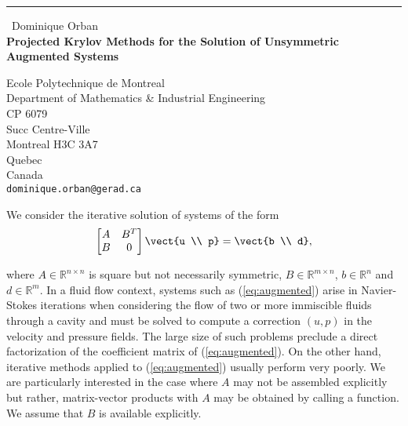 \documentclass{report}
\begin{document}
\begin{center}
\rule{6in}{1pt} \
{\large Dominique Orban \\
{\bf Projected Krylov Methods for the Solution of Unsymmetric Augmented Systems}}

Ecole Polytechnique de Montreal \\ Department of Mathematics & Industrial Engineering \\ CP 6079 \\ Succ Centre-Ville \\ Montreal H3C 3A7 \\ Quebec \\ Canada
\\
{\tt dominique.orban@gerad.ca}\end{center}

\newcommand{\eqn}[2]{%
\begin{equation}
\label{#1}
{#2}
\end{equation}
}
\newcommand{\req}[1]{(\ref{#1})}
\newcommand{\sub}[1]{_{{\mbox {\tiny #1}}}}
\newcommand{\half}{{\textstyle \frac{1}{2}}}
\newcommand{\T}{^T\!}
\newcommand{\R}{{\mathbb R}}
\newcommand{\minim}{\mathop{\hbox{minimize}}}
\newcommand{\minimize}[1]{\displaystyle\minim_{#1}}
\newcommand{\st}{\mathop{\hbox{subject to}}}

We consider the iterative solution of systems of the form
\eqn{eq:augmented}{
\begin{bmatrix}
A & B^T \\
B & 0
\end{bmatrix}
\vect{u \\ p} = \vect{b \\ d},
}
where $A \in \R^{n \times n}$ is square but not necessarily symmetric, $B \in
\R^{m \times n}$, $b \in \R^n$ and $d \in \R^m$. In a fluid flow context,
systems such as \req{eq:augmented} arise in Navier-Stokes
iterations when considering the flow of two or more immiscible fluids through a
cavity and must be solved to compute a correction $(u,p)$ in the velocity and
pressure fields. The large size of such problems preclude a direct
factorization of the coefficient matrix of \req{eq:augmented}. On the other
hand, iterative methods applied to \req{eq:augmented} usually perform very
poorly. We are particularly interested in the case where $A$ may not be
assembled explicitly but rather, matrix-vector products with $A$ may be
obtained by calling a function. We assume that $B$ is available explicitly.
\end{document}
